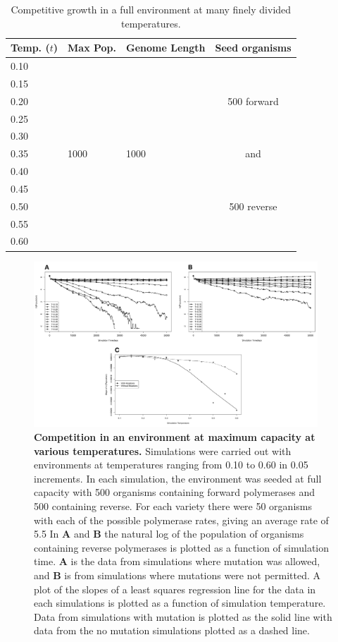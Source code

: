 \begin{table}
	\begin{center}
		\begin{tabular}[c]{ l | l | l | c }
			Temp. ($t$) & Max Pop. & Genome Length & Seed organisms \\
			\hline
			0.10 & & &\\
			0.15 & & &\\
			0.20 & & & 500 forward\\
			0.25 & & &\\
			0.30 & & &\\
			0.35 & 1000 & 1000 & and\\
			0.40 & & &\\
			0.45 & & &\\
			0.50 & & & 500 reverse\\
			0.55 & & &\\
			0.60 & & &\\
		\end{tabular}
		\caption{Competitive growth in a full environment at many finely divided temperatures.}
		\label{tab:strict_log}
	\end{center}
\end{table}

\begin{figure}[!ht]
	\begin{center}
		\includegraphics[width=0.95\textwidth]{strict_compet_log}
	\end{center}
	\caption{
		{\bf Competition in an environment at maximum capacity at various temperatures.}  Simulations were carried out with environments at temperatures ranging from 0.10 to 0.60 in 0.05 increments. In each simulation, the environment was seeded at full capacity with 500 organisms containing forward polymerases and 500 containing reverse. For each variety there were 50 organisms with each of the possible polymerase rates, giving an average rate of 5.5 In \textbf{A} and \textbf{B} the natural log of the population of organisms containing reverse polymerases is plotted as a function of simulation time. \textbf{A} is the data from simulations where mutation was allowed, and \textbf{B} is from simulations where mutations were not permitted. A plot of the slopes of a least squares regression line for the data in each simulations is plotted as a function of simulation temperature. Data from simulations with mutation is plotted as the solid line with data from the no mutation simulations plotted as a dashed line.
		}
		\label{fig:strict_compet_log}
\end{figure}
